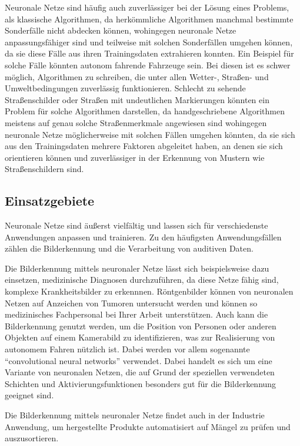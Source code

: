 Neuronale Netze sind häufig auch zuverlässiger bei der Lösung eines Problems, als klassische Algorithmen, da herkömmliche Algorithmen manchmal bestimmte Sonderfälle nicht abdecken können, wohingegen neuronale Netze anpassungsfähiger sind und teilweise mit solchen Sonderfällen umgehen können, da sie diese Fälle aus ihren Trainingsdaten extrahieren konnten.
Ein Beispiel für solche Fälle könnten autonom fahrende Fahrzeuge sein.
Bei diesen ist es schwer möglich, Algorithmen zu schreiben, die unter allen Wetter-, Straßen- und Umweltbedingungen zuverlässig funktionieren.
Schlecht zu sehende Straßenschilder oder Straßen mit undeutlichen Markierungen könnten ein Problem für solche Algorithmen darstellen, da handgeschriebene Algorithmen meistens auf genau solche Straßenmerkmale angewiesen sind wohingegen neuronale Netze möglicherweise mit solchen Fällen umgehen könnten, da sie sich aus den Trainingsdaten mehrere Faktoren abgeleitet haben, an denen sie sich orientieren können und zuverlässiger in der Erkennung von Mustern wie Straßenschildern sind.

\subsection{Einsatzgebiete}\label{subsec:einleitung_nn:einsatzgebiete}
Neuronale Netze sind äußerst vielfältig und lassen sich für verschiedenste Anwendungen anpassen und trainieren.
Zu den häufigsten Anwendungsfällen zählen die Bilderkennung und die Verarbeitung von auditiven Daten.

Die Bilderkennung mittels neuronaler Netze lässt sich beispielsweise dazu einsetzen, medizinische Diagnosen durchzuführen, da diese Netze fähig sind, komplexe Krankheitsbilder zu erkennnen.
Röntgenbilder können von neuronalen Netzen auf Anzeichen von Tumoren untersucht werden und können so medizinisches Fachpersonal bei Ihrer Arbeit unterstützen.
Auch kann die Bilderkennung genutzt werden, um die Position von Personen oder anderen Objekten auf einem Kamerabild zu identifizieren, was zur Realisierung von autonomem Fahren nützlich ist.
Dabei werden vor allem sogenannte “convolutional neural networks” verwendet.
Dabei handelt es sich um eine Variante von neuronalen Netzen, die auf Grund der speziellen verwendeten Schichten und Aktivierungsfunktionen besonders gut für die Bilderkennung geeignet sind.

Die Bilderkennung mittels neuronaler Netze findet auch in der Industrie Anwendung, um hergestellte Produkte automatisiert auf Mängel zu prüfen und auszusortieren.


